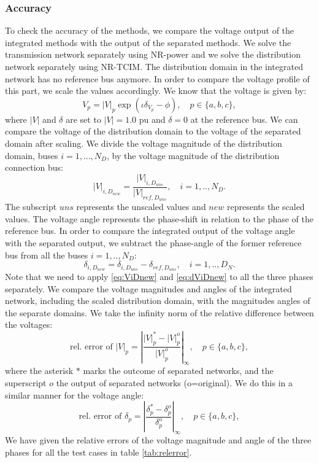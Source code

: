 \documentclass[10pt,journal]{article}
\begin{document}
\subsubsection{Accuracy} 
To check the accuracy of the methods, we compare the voltage output of the integrated methods with the output of the separated methods. We solve the transmission network separately using NR-power and we solve the distribution network separately using NR-TCIM. The distribution domain in the integrated network has no reference bus anymore. In order to compare the voltage profile of this part, we scale the values accordingly. 
We know that the voltage is given by: \begin{equation}
V_p=|V|_p\exp{(\iota\delta_{V_p}-\phi)},\quad p\in\{a,b,c\},
\end{equation}
where $|V|$ and $\delta$ are set to $|V|=1.0$ pu and $\delta=0$ at the reference bus. We can compare the voltage of the distribution domain to the voltage of the separated domain after scaling. We divide the voltage magnitude of the distribution domain, buses $i=1,...,N_D$, by the voltage magnitude of the distribution connection bus: 
\begin{equation}
|V|_{i,{D_{new}}} = \frac{|V|_{i,{D_{uns}}}}{|V|_{ref,{D_{uns}}}},\quad i=1,..,N_D.
\label{eq:ViDnew}
\end{equation}
The subscript $uns$ represents the unscaled values and $new$ represents the scaled values. \newline 
The voltage angle represents the phase-shift in relation to the phase of the reference bus. In order to compare the integrated output of the voltage angle with the separated output, we subtract the phase-angle of the former reference bus from all the buses $i=1,..,N_D$: 
\begin{equation}
\delta_{i,{D_{new}}} ={\delta_{i,{D_{uns}}}}-{\delta_{ref,{D_{uns}}}},\quad i=1,..,D_N.
\label{eq:dViDnew}
\end{equation}
Note that we need to apply \eqref{eq:ViDnew} and \eqref{eq:dViDnew} to all the three phases separately. \newline\newline
We compare the voltage magnitudes and angles of the integrated network, including the scaled distribution domain, with the magnitudes angles of the separate domains. We take the infinity norm of the relative difference between the voltages: 
\begin{equation}
\mbox{rel. error of } |V|_p = \left|\frac{|V|^*_p - |V|^o_p}{|V|^o_p}\right|_\infty,\quad p\in\{a,b,c\},
\label{eq:norm|V|}
\end{equation}
where the asterisk $*$ marks the outcome of separated networks, and the superscript $o$ the output of separated networks (o=original). We do this in a similar manner for the voltage angle: 
\begin{equation}
\mbox{rel. error of } \delta_p = \left|\frac{\delta^*_p - \delta^o_p}{\delta^o_p}\right|_\infty,\quad p\in\{a,b,c\},
\label{eq:normdelta}
\end{equation}
We have given the relative errors of the voltage magnitude and angle of the three phases for all the test cases in table \ref{tab:relerror}. 
\end{document}
